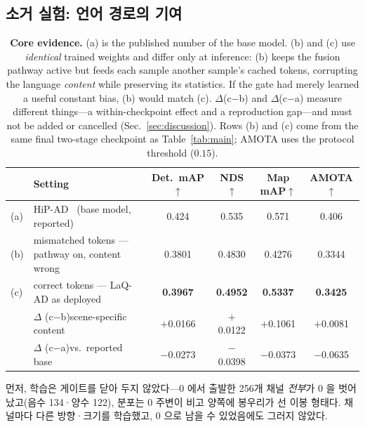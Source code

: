 \documentclass[conference]{IEEEtran}
\newcommand{\measured}[1]{#1}
\begin{document}
\subsection{소거 실험: 언어 경로의 기여}
\label{sec:ablation}

\begin{table}[t]
\caption{\textbf{Core evidence.} (a) is the published number of the base
model. (b) and (c) use \emph{identical} trained weights and differ only at
inference: (b) keeps the fusion pathway active but feeds each sample another
sample's cached tokens, corrupting the language \emph{content} while
preserving its statistics. If the gate had merely learned a useful constant
bias, (b) would match (c). $\Delta$(c$-$b) and $\Delta$(c$-$a) measure
different things---a within-checkpoint effect and a reproduction gap---and
must not be added or cancelled (Sec.~\ref{sec:discussion}). Rows (b) and (c)
come from the same final two-stage checkpoint as Table~\ref{tab:main}; AMOTA
uses the protocol threshold ($0.15$).}
\label{tab:ablation}
\centering
\small
\begin{tabular}{llcccc}
\toprule
 & Setting & Det.\ mAP$\uparrow$ & NDS$\uparrow$ & Map mAP$\uparrow$ & AMOTA$\uparrow$ \\
\midrule
(a) & HiP-AD~\cite{hipad2025} (base model, reported)
  & 0.424 & 0.535 & 0.571 & 0.406 \\
(b) & mismatched tokens --- pathway on, content wrong
  & \measured{0.3801} & \measured{0.4830} & \measured{0.4276} & \measured{0.3344}\\
(c) & correct tokens --- LaQ-AD as deployed
  & \measured{\textbf{0.3967}} & \measured{\textbf{0.4952}}
  & \measured{\textbf{0.5337}} & \measured{\textbf{0.3425}}\\
\midrule
  & $\Delta$ (c$-$b)\quad scene-specific content
  & \measured{$+$0.0166} & \measured{$+$0.0122}
  & \measured{$+$0.1061} & \measured{$+$0.0081}\\
  & $\Delta$ (c$-$a)\quad vs.\ reported base
  & \measured{$-$0.0273} & \measured{$-$0.0398}
  & \measured{$-$0.0373} & \measured{$-$0.0635}\\
\bottomrule
\end{tabular}
\end{table}




먼저, 학습은 게이트를 닫아 두지 않았다---0 에서 출발한 \measured{256}개 채널 \emph{전부}가 0 을 벗어났고(음수
\measured{134}·양수 \measured{122}), 분포는 0 주변이 비고 양쪽에 봉우리가 선 이봉
형태다. 채널마다 다른 방향·크기를 학습했고, 0 으로 남을 수 있었음에도 그러지 않았다.
\end{document}
